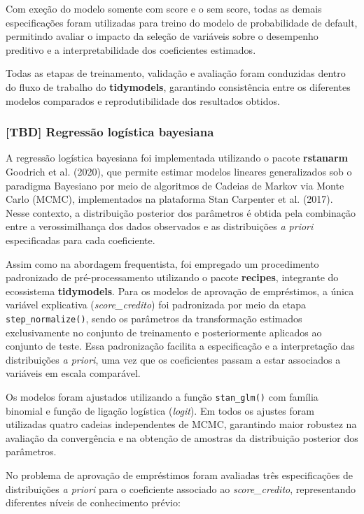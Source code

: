 \documentclass[
  brazilian,
  12pt,
  letterpaper,
  DIV=11,
  numbers=noendperiod]{scrartcl}
\begin{document}
Com exeção do modelo somente com score e o sem score, todas as demais
especificações foram utilizadas para treino do modelo de probabilidade
de default, permitindo avaliar o impacto da seleção de variáveis sobre o
desempenho preditivo e a interpretabilidade dos coeficientes estimados.

Todas as etapas de treinamento, validação e avaliação foram conduzidas
dentro do fluxo de trabalho do \textbf{tidymodels}, garantindo
consistência entre os diferentes modelos comparados e reprodutibilidade
dos resultados obtidos.

\subsubsection{{[}TBD{]} Regressão logística
bayesiana}\label{tbd-regressuxe3o-loguxedstica-bayesiana}

A regressão logística bayesiana foi implementada utilizando o pacote
\textbf{rstanarm} Goodrich et al. (2020), que permite estimar modelos
lineares generalizados sob o paradigma Bayesiano por meio de algoritmos
de Cadeias de Markov via Monte Carlo (MCMC), implementados na plataforma
Stan Carpenter et al. (2017). Nesse contexto, a distribuição posterior
dos parâmetros é obtida pela combinação entre a verossimilhança dos
dados observados e as distribuições \emph{a priori} especificadas para
cada coeficiente.

Assim como na abordagem frequentista, foi empregado um procedimento
padronizado de pré-processamento utilizando o pacote \textbf{recipes},
integrante do ecossistema \textbf{tidymodels}. Para os modelos de
aprovação de empréstimos, a única variável explicativa
(\emph{score\_credito}) foi padronizada por meio da etapa
\texttt{step\_normalize()}, sendo os parâmetros da transformação
estimados exclusivamente no conjunto de treinamento e posteriormente
aplicados ao conjunto de teste. Essa padronização facilita a
especificação e a interpretação das distribuições \emph{a priori}, uma
vez que os coeficientes passam a estar associados a variáveis em escala
comparável.

Os modelos foram ajustados utilizando a função \texttt{stan\_glm()} com
família binomial e função de ligação logística (\emph{logit}). Em todos
os ajustes foram utilizadas quatro cadeias independentes de MCMC,
garantindo maior robustez na avaliação da convergência e na obtenção de
amostras da distribuição posterior dos parâmetros.

No problema de aprovação de empréstimos foram avaliadas três
especificações de distribuições \emph{a priori} para o coeficiente
associado ao \emph{score\_credito}, representando diferentes níveis de
conhecimento prévio:
\end{document}
